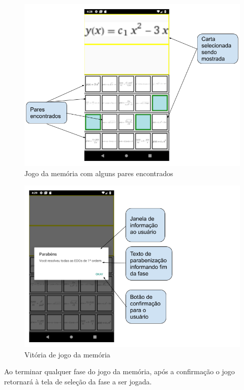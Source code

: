 \begin{figure}[H]
\centering
\caption{Jogo da memória com alguns pares encontrados}
\includegraphics[width=\textwidth,height=\textheight,keepaspectratio]{figuras/resolucaoCartasAcertadas.png}
\end{figure}

\begin{figure}[H]
\centering
\caption{Vitória de jogo da memória}
\includegraphics[scale=0.72]{figuras/resolucao_fim.png}
\end{figure}

Ao terminar qualquer fase do jogo da memória, após a confirmação o jogo retornará à tela de seleção da fase a ser jogada.

